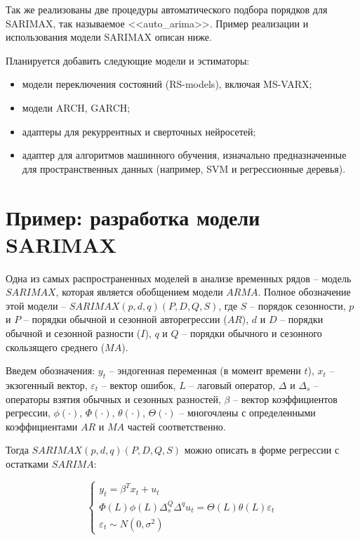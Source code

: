 \documentclass[a4paper,14pt]{extreport}
\begin{document}
	Так же реализованы две процедуры автоматического подбора порядков для SARIMAX, так называемое <<auto\_arima>>\cite{pyramid_arima}. Пример реализации и использования модели SARIMAX описан ниже.
	
	Планируется добавить следующие модели и эстиматоры:
	\begin{itemize}
		\item модели переключения состояний (RS-models), включая MS-VARX;
		\item модели ARCH, GARCH;
		\item адаптеры для рекуррентных и сверточных нейросетей;
		\item адаптер для алгоритмов машинного обучения, изначально предназначенные для пространственных данных (например, SVM и регрессионные деревья).
	\end{itemize}
	
	
	\section{Пример: разработка модели SARIMAX}
	
	Одна из самых распространенных моделей в анализе временных рядов – модель $SARIMAX$, которая является обобщением модели $ARMA$. Полное обозначение этой модели – $SARIMAX(p,d,q)(P,D,Q,S)$, где $S$ – порядок сезонности, $p$ и $P$ – порядки обычной и сезонной авторегрессии ($AR$), $d$ и $D$ – порядки обычной и сезонной разности ($I$), $q$ и $Q$ – порядки обычного и сезонного скользящего среднего ($MA$).
	
	Введем обозначения:
	$y_t$ – эндогенная переменная (в момент времени $t$), 
	$x_t$ – экзогенный вектор, 
	$\varepsilon_t$ – вектор ошибок, 
	$L$ – лаговый оператор, 
	$\Delta$ и $\Delta_s$ – операторы взятия обычных и сезонных разностей, 
	$\beta$ – вектор коэффициентов регрессии, 
	$\phi(\cdot)$, $\Phi(\cdot)$, $\theta(\cdot)$, $\Theta(\cdot)$ – многочлены с определенными коэффициентами $AR$ и $MA$ частей соответственно.
	
	Тогда $SARIMAX(p,d,q)(P,D,Q,S)$ можно описать в форме регрессии с остатками $SARIMA$:
	
	\begin{equation}
	\begin{cases}
	y_t = \beta^{T} x_t + u_t \\
	\Phi(L) \phi(L) \Delta_s^{Q} \Delta^{q} u_t = \Theta(L) \theta(L) \varepsilon_t \\
	\varepsilon_t \sim N(0,\sigma^{2})
	\end{cases}
	\end{equation}
	
\end{document}
